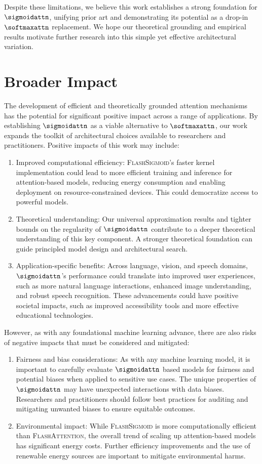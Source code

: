 Despite these limitations, we believe this work establishes a strong foundation for $\sigmoidattn$, unifying prior art and demonstrating its potential as a drop-in $\softmaxattn$ replacement. We hope our theoretical grounding and empirical results motivate further research into this simple yet effective architectural variation.

\section{Broader Impact}
\label{sec:broader_impact}
The development of efficient and theoretically grounded attention mechanisms has the potential for significant positive impact across a range of applications. By establishing $\sigmoidattn$ as a viable alternative to $\softmaxattn$, our work expands the toolkit of architectural choices available to researchers and practitioners.
Positive impacts of this work may include:
\begin{enumerate}
    \item Improved computational efficiency: \textsc{FlashSigmoid}'s faster kernel implementation could lead to more efficient training and inference for attention-based models, reducing energy consumption and enabling deployment on resource-constrained devices. This could democratize access to powerful models.
    \item Theoretical understanding: Our universal approximation results and tighter bounds on the regularity of $\sigmoidattn$ contribute to a deeper theoretical understanding of this key component. A stronger theoretical foundation can guide principled model design and architectural search.
    \item Application-specific benefits: Across language, vision, and speech domains, $\sigmoidattn$'s performance could translate into improved user experiences, such as more natural language interactions, enhanced image understanding, and robust speech recognition. These advancements could have positive societal impacts, such as improved accessibility tools and more effective educational technologies.
\end{enumerate}
However, as with any foundational machine learning advance, there are also risks of negative impacts that must be considered and mitigated:
\begin{enumerate}
    \item Fairness and bias considerations: As with any machine learning model, it is important to carefully evaluate $\sigmoidattn$ based models for fairness and potential biases when applied to sensitive use cases. The unique properties of $\sigmoidattn$ may have unexpected interactions with data biases. Researchers and practitioners should follow best practices for auditing and mitigating unwanted biases to ensure equitable outcomes.
    \item Environmental impact: While \textsc{FlashSigmoid} is more computationally efficient than \textsc{FlashAttention}, the overall trend of scaling up attention-based models has significant energy costs. Further efficiency improvements and the use of renewable energy sources are important to mitigate environmental harms.
\end{enumerate}
